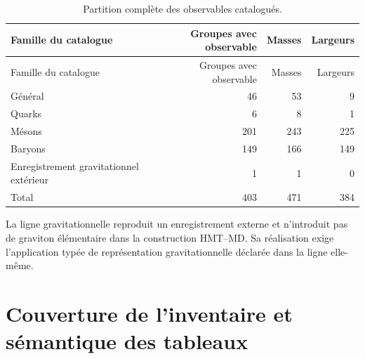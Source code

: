 \begin{longtable}{@{}lrrr@{}}
\caption{Partition complète des observables catalogués.}
\label{tab:particion-inventario-total-rev6}\\
\toprule
Famille du catalogue & Groupes avec observable & Masses & Largeurs\\
\midrule
\endfirsthead
\toprule
Famille du catalogue & Groupes avec observable & Masses & Largeurs\\
\midrule
\endhead
Général &46&53&9\\
Quarks
&6&8&1\\
Mésons&201&243&225\\
Baryons&149&166&149\\
Enregistrement gravitationnel extérieur&1&1&0\\
\midrule
Total&403&471&384\\
\bottomrule
\end{longtable}

La ligne gravitationnelle reproduit un enregistrement externe et n’introduit pas de graviton élémentaire dans la construction HMT--MD. Sa réalisation exige l’application typée de représentation gravitationnelle déclarée dans la ligne elle-même.

\section{Couverture de l’inventaire et sémantique des tableaux}

